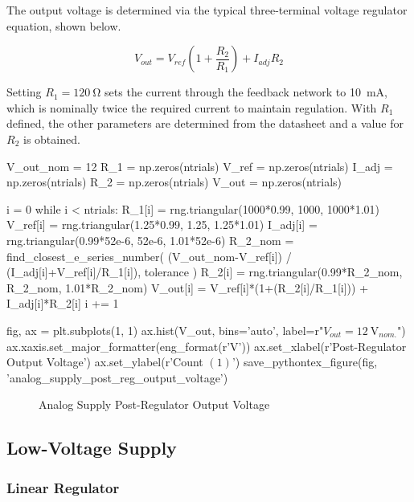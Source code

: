 \documentclass[12pt, titlepage]{/home/air/projects/latex-template/tex-template}
\begin{document}
The output voltage is determined via the typical three-terminal voltage regulator equation, shown below.

$$ V_{out} = V_{ref}\left(1+\frac{R_2}{R_1}\right) + I_{adj}R_2 $$

Setting $R_1=\SI{120}{\ohm}$ sets the current through the feedback network to \SI{10}{\milli\ampere}, which is nominally twice the required current to maintain regulation. With $R_1$ defined, the other parameters are determined from the datasheet and a value for $R_2$ is obtained.

\begin{pycode}
V_out_nom = 12
R_1 = np.zeros(ntrials)
V_ref = np.zeros(ntrials)
I_adj = np.zeros(ntrials)
R_2 = np.zeros(ntrials)
V_out = np.zeros(ntrials)

i = 0
while i < ntrials: 
    R_1[i] = rng.triangular(1000*0.99, 1000, 1000*1.01)
    V_ref[i] = rng.triangular(1.25*0.99, 1.25, 1.25*1.01)
    I_adj[i] = rng.triangular(0.99*52e-6, 52e-6, 1.01*52e-6)
    R_2_nom = find_closest_e_series_number(
        (V_out_nom-V_ref[i]) / (I_adj[i]+V_ref[i]/R_1[i]),
        tolerance
        )
    R_2[i] = rng.triangular(0.99*R_2_nom, R_2_nom, 1.01*R_2_nom)
    V_out[i] = V_ref[i]*(1+(R_2[i]/R_1[i])) + I_adj[i]*R_2[i]
    i += 1

fig, ax = plt.subplots(1, 1)
ax.hist(V_out, bins='auto', label=r"$V_{out}=\SI{12}{\volt}_{nom.}$")
ax.xaxis.set_major_formatter(eng_format(r'\unit{\volt}'))
ax.set_xlabel(r'Post-Regulator Output Voltage')
ax.set_ylabel(r'Count $\left(1\right)$')
save_pythontex_figure(fig, 'analog_supply_post_reg_output_voltage')
\end{pycode}

\begin{figure}[!ht]
    \centering
    
    \caption{Analog Supply Post-Regulator Output Voltage}
\end{figure}

\subsection{Low-Voltage Supply}
\subsubsection{Linear Regulator}
\end{document}
